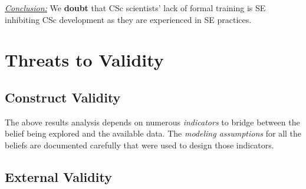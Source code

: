 \documentclass[conference,10pt]{IEEEtran}
\newenvironment{RQ}{\vspace{1mm}\begin{tcolorbox}[enhanced,width=3.4in,size=fbox,colback=red!5!white,drop shadow southeast,sharp corners]}{\end{tcolorbox}}
\begin{document}
\begin{RQ}
\textit{\underline{Conclusion:}} 
We \textbf{doubt} that CSc scientists' lack of formal training is SE inhibiting CSc development as they are experienced in SE practices.
\end{RQ}






\section{Threats to Validity}

\subsection{Construct Validity}

The above results analysis depends on numerous {\em indicators} to bridge between the belief being explored and the available data. 
The {\em modeling assumptions} for all the beliefs are documented carefully that were used to design those indicators.

\subsection{External Validity}
\end{document}
